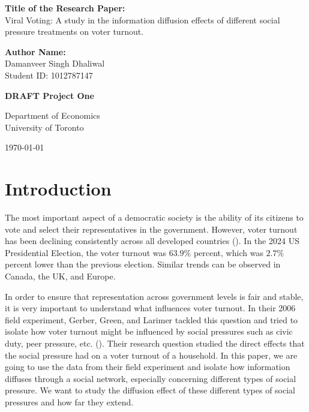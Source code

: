 \documentclass[11pt]{article}
\begin{document}
\begin{titlepage}
    \centering
    \vspace*{2cm}
    
    \vspace{0.5cm}

    \Large{\textbf{Title of the Research Paper:}}\\
    Viral Voting: A study in the information diffusion effects of different social pressure treatments on voter turnout.
    
    \vspace{0.5cm}

    \Large{\textbf{Author Name:}}\\
    \Large{Damanveer Singh Dhaliwal}\\
    \Large{Student ID: 1012787147}

    \vspace{0.5cm}
    
    \Large{\textbf{DRAFT Project One}}
    
    \vfill
    
    \large{Department of Economics}\\
    \large{University of Toronto}
    
    \vspace{0.8cm}
    
    \large{\today}
    
\end{titlepage}

\section{Introduction}
The most important aspect of a democratic society is the ability of its citizens to vote and select their representatives in the government. However, voter turnout has been declining consistently across all developed countries (\cite{solijonov_voter_nodate}). In the 2024 US Presidential Election, the voter turnout was $63.9\%$ percent, which was $2.7\%$ percent lower than the previous election. Similar trends can be observed in Canada, the UK, and Europe.

In order to ensure that representation across government levels is fair and stable, it is very important to understand what influences voter turnout. In their 2006 field experiment, Gerber, Green, and Larimer tackled this question and tried to isolate how voter turnout might be influenced by social pressures such as civic duty, peer pressure, etc. (\cite{gerber_social_2008}). Their research question studied the direct effects that the social pressure had on a voter turnout of a household. In this paper, we are going to use the data from their field experiment and isolate how information diffuses through a social network, especially concerning different types of social pressure. We want to study the diffusion effect of these different types of social pressures and how far they extend. 
\end{document}
